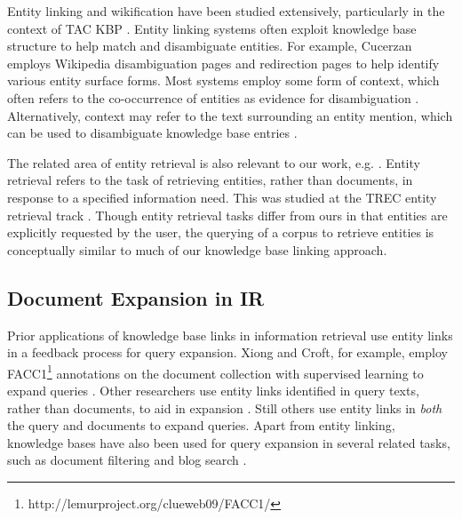 \documentclass{sig-alternate}
\begin{document}
Entity linking and wikification have been studied extensively, particularly in the context of TAC KBP \cite{Ji2014}. Entity linking systems often exploit knowledge base structure to help match and disambiguate entities. For example, Cucerzan \cite{Cucerzan2007} employs Wikipedia disambiguation pages and redirection pages to help identify various entity surface forms. Most systems employ some form of context, which often refers to the co-occurrence of entities as evidence for disambiguation \cite{Stoyanov2012, Dalton2013}. Alternatively, context may refer to the text surrounding an entity mention, which can be used to disambiguate knowledge base entries \cite{Mihalcea2007, Dalton2013}.

The related area of entity retrieval is also relevant to our work, e.g. \cite{Adafre2007, Bron2010}. Entity retrieval refers to the task of retrieving entities, rather than documents, in response to a specified information need. This was studied at the TREC entity retrieval track \cite{Balog2011}. Though entity retrieval tasks differ from ours in that entities are explicitly requested by the user, the querying of a corpus to retrieve entities is conceptually similar to much of our knowledge base linking approach.

\subsection{Document Expansion in IR}\label{section.related.ir}

Prior applications of knowledge base links in information retrieval use entity links in a feedback process for query expansion. Xiong and Croft, for example, employ FACC1\footnote{http://lemurproject.org/clueweb09/FACC1/} annotations on the document collection with supervised learning to expand queries \cite{Xiong2015}. Other researchers use entity links identified in query texts, rather than documents, to aid in expansion \cite{Xu2009, Brandao2014}. Still others use entity links in \textit{both} the query and documents \cite{Dalton2014, Li2015} to expand queries. Apart from entity linking, knowledge bases have also been used for query expansion in several related tasks, such as document filtering \cite{Xie2015} and blog search \cite{Elsas2008, Weerkamp2009}.
\end{document}
